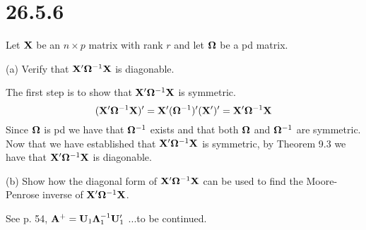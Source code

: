 \section*{26.5.6}
Let $\bf X$ be an $n\times p$ matrix with rank $r$ and let
$\bf\Omega$ be a pd matrix.

\bigskip
\noindent
(a) Verify that ${\bf X}'{\bf\Omega}^{-1}{\bf X}$ is diagonable.

\bigskip
\noindent
The first step is to show that ${\bf X}'{\bf\Omega}^{-1}{\bf X}$
is symmetric.
$$({\bf X}'{\bf\Omega}^{-1}{\bf X})'
={\bf X}'({\bf\Omega}^{-1})'({\bf X}')'
={\bf X}'{\bf\Omega}^{-1}{\bf X}
$$
Since $\bf\Omega$ is pd we have that ${\bf\Omega}^{-1}$ exists
and that both ${\bf\Omega}$ and ${\bf\Omega}^{-1}$ are symmetric.
Now that we have established that
${\bf X}'{\bf\Omega}^{-1}{\bf X}$
is symmetric, by Theorem 9.3 we have that
${\bf X}'{\bf\Omega}^{-1}{\bf X}$
is diagonable.

\bigskip
\noindent
(b) Show how the diagonal form of ${\bf X}'{\bf\Omega}^{-1}{\bf X}$
can be used to find the Moore-Penrose inverse of
${\bf X}'{\bf\Omega}^{-1}{\bf X}$.

\bigskip
\noindent
See p. 54, ${\bf A}^+={\bf U}_1{\bf\Lambda}_1^{-1}{\bf U}_1'$
...to be continued.
